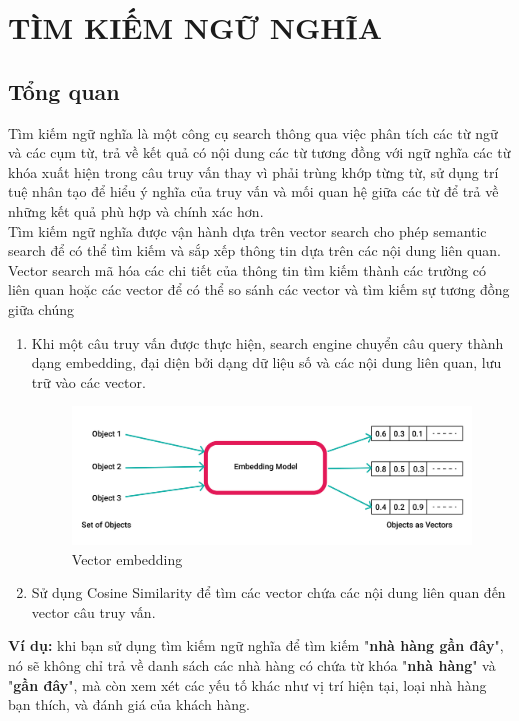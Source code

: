 \section{TÌM KIẾM NGỮ NGHĨA}
\subsection{Tổng quan}
\hspace*{1cm}Tìm kiếm ngữ nghĩa là một công cụ search thông qua việc phân tích các từ ngữ và các cụm từ, trả về kết quả có nội dung các từ tương đồng với ngữ nghĩa các từ khóa xuất hiện trong câu truy vấn thay vì phải trùng khớp từng từ, sử dụng trí tuệ nhân tạo để hiểu ý nghĩa của truy vấn và mối quan hệ giữa các từ để trả về những kết quả phù hợp và chính xác hơn.\\
\hspace*{1cm}Tìm kiếm ngữ nghĩa được vận hành dựa trên vector search cho phép semantic search để có thể tìm kiếm và sắp xếp thông tin dựa trên các nội dung liên quan. Vector search mã hóa các chi tiết của thông tin tìm kiếm thành các trường có liên quan hoặc các vector để có thể so sánh các vector và tìm kiếm sự tương đồng giữa chúng
\begin{enumerate}
    \item Khi một câu truy vấn được thực hiện, search engine chuyển câu query thành dạng embedding, đại diện bởi dạng dữ liệu số và các nội dung liên quan, lưu trữ vào các vector.
    \begin{figure}[H]
        \centering
        \includegraphics[width=1\textwidth]{Images/embedding.png}
        \caption{Vector embedding}
        \label{fig:ftsexample}
    \end{figure}
    \item Sử dụng Cosine Similarity để tìm các vector chứa các nội dung liên quan đến vector câu truy vấn.
\end{enumerate}
\textbf{Ví dụ:} khi bạn sử dụng tìm kiếm ngữ nghĩa để tìm kiếm "\textbf{nhà hàng gần đây}", nó sẽ không chỉ trả về danh sách các nhà hàng có chứa từ khóa "\textbf{nhà hàng}" và "\textbf{gần đây}", mà còn xem xét các yếu tố khác như vị trí hiện tại, loại nhà hàng bạn thích, và đánh giá của khách hàng.
